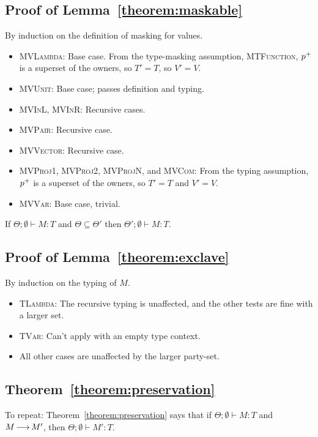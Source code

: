 \subsection{Proof of Lemma~\ref{theorem:maskable}}
By induction on the definition of masking for values.
\begin{itemize}
\item \textsc{MVLambda}: Base case. From the type-masking assumption, \textsc{MTFunction},
  ${p^{+}}$ is a superset of the owners,
  so $T' = T$, so $V' = V$.
\item \textsc{MVUnit}: Base case; passes definition and typing.
\item \textsc{MVInL}, \textsc{MVInR}: Recursive cases.
\item \textsc{MVPair}: Recursive case.
\item \textsc{MVVector}: Recursive case.
\item \textsc{MVProj1}, \textsc{MVProj2}, \textsc{MVProjN}, and \textsc{MVCom}:
  From the typing assumption, ${p^{+}}$ is a superset of the owners,
  so $T' = T$ and $V' = V$.
\item \textsc{MVVar}: Base case, trivial.
\end{itemize}

\begin{lemma}[Exclave]\label{theorem:exclave}
  If $Θ;∅ ⊢ M : T$ and $Θ \subseteq Θ'$
  then $Θ';∅ ⊢ M : T$.
\end{lemma}
\subsection{Proof of Lemma~\ref{theorem:exclave}}
By induction on the typing of $M$.
\begin{itemize}
\item \textsc{TLambda}: The recursive typing is unaffected,
  and the other tests are fine with a larger set.
\item \textsc{TVar}: Can't apply with an empty type context.
\item All other cases are unaffected by the larger party-set.
\end{itemize}


\subsection{Theorem~\ref{theorem:preservation}}

To repeat: Theorem~\ref{theorem:preservation} says that
if $Θ;∅ ⊢ M : T$ and $M \operatorname{\longrightarrow} M'$,
then $Θ;∅ ⊢ M' : T$.

